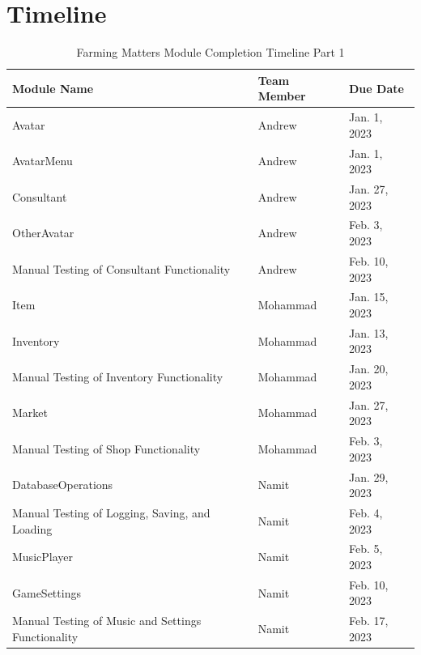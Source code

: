 \documentclass[12pt, titlepage]{article}
\begin{document}
\section{Timeline}

\begin{table}[H]
\centering
\begin{tabular}{p{} p{}  p{}}
\toprule
Module Name & Team Member & Due Date \\
\midrule
Avatar & Andrew & Jan. 1, 2023\\
AvatarMenu & Andrew & Jan. 1, 2023\\
Consultant & Andrew & Jan. 27, 2023\\
OtherAvatar & Andrew & Feb. 3, 2023\\
Manual Testing of Consultant Functionality & Andrew & Feb. 10, 2023\\
Item & Mohammad & Jan. 15, 2023\\
Inventory & Mohammad & Jan. 13, 2023\\ 
Manual Testing of Inventory Functionality & Mohammad & Jan. 20, 2023\\ 
Market & Mohammad & Jan. 27, 2023\\
Manual Testing of Shop Functionality & Mohammad & Feb. 3, 2023\\ 
DatabaseOperations & Namit & Jan. 29, 2023\\
Manual Testing of Logging, Saving, and Loading & Namit & Feb. 4, 2023\\ 
MusicPlayer & Namit & Feb. 5, 2023\\
GameSettings & Namit & Feb. 10, 2023\\
Manual Testing of Music and Settings Functionality& Namit & Feb. 17, 2023\\ 
\end{tabular}
\caption{Farming Matters Module Completion Timeline Part 1}
\label{TblMH}
\end{table}
\end{document}

